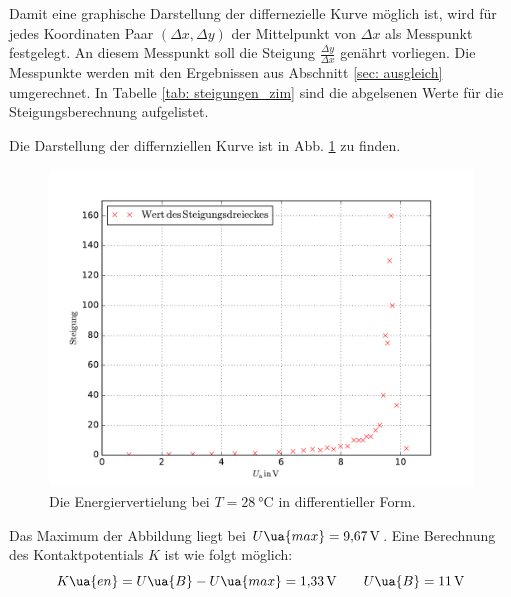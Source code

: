 Damit eine graphische Darstellung der differnezielle Kurve möglich ist, wird für jedes Koordinaten Paar $(\Delta x,\Delta y)$ der Mittelpunkt
von $\Delta x$ als Messpunkt festgelegt. An diesem Messpunkt soll die Steigung $\frac{\Delta y}{\Delta x}$ genährt vorliegen.
Die Messpunkte werden mit den Ergebnissen aus Abschnitt \ref{sec: ausgleich} umgerechnet.
In Tabelle \ref{tab: steigungen_zim} sind die abgelsenen Werte für die Steigungsberechnung aufgelistet.

Die Darstellung der differnziellen Kurve ist in Abb. \ref{fig: energie_zim_diff} zu finden.
\begin{figure}
  \centering
  \includegraphics[width=0.8 \textwidth]{../Messdaten/energie_zim.pdf}
  \caption{Die Energiervertielung bei $T=\SI{28}{\celsius}$ in differentieller Form.}
  \label{fig: energie_zim_diff}
\end{figure}
Das Maximum der Abbildung liegt bei $U\ua{max}=\SI{9.67}{\volt}$.
Eine Berechnung des Kontaktpotentials $K$ ist wie folgt möglich:
\begin{equation}
\label{eq:k_energie_zim}
  K\ua{en}=U\ua{B}-U\ua{max}=\SI{1.33}{\volt} \qquad U\ua{B}=\SI{11}{\volt}
\end{equation}
\FloatBarrier

